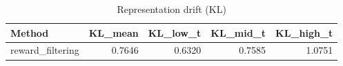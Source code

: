 \begin{table}[htbp]
\centering
\caption{Representation drift (KL)}
\label{tab:repr-drift}
\begin{tabular}{lrrrr}
\toprule
\textbf{Method} & \textbf{KL\_mean} & \textbf{KL\_low\_t} & \textbf{KL\_mid\_t} & \textbf{KL\_high\_t} \\
\midrule
reward\_filtering & 0.7646 & 0.6320 & 0.7585 & 1.0751 \\
\bottomrule
\end{tabular}
\end{table}